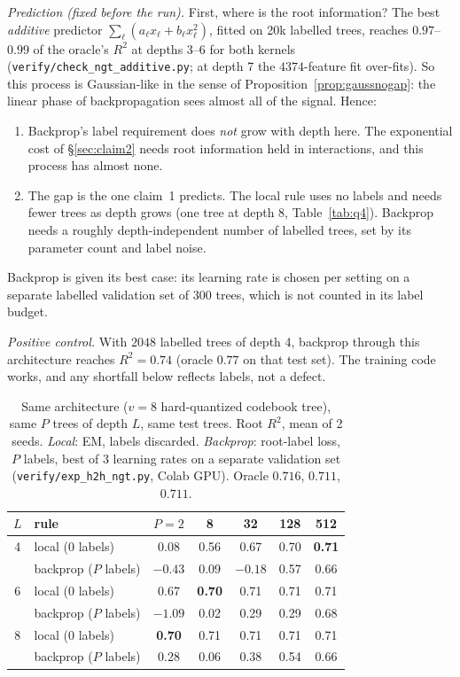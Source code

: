 \documentclass[11pt]{article}
\theoremstyle{definition}
\begin{document}
\emph{Prediction (fixed before the run).} First, where is the root information? The best \emph{additive}
predictor $\sum_\ell(a_\ell x_\ell+b_\ell x_\ell^2)$, fitted on 20k labelled trees, reaches $0.97$--$0.99$ of
the oracle's $R^2$ at depths 3--6 for both kernels (\texttt{verify/check\_ngt\_additive.py}; at depth 7
the $4374$-feature fit over-fits). So this process is Gaussian-like in the sense of
Proposition~\ref{prop:gaussnogap}: the linear phase of backpropagation sees almost all of the signal.
Hence:
\begin{enumerate}
\item[(H1)] Backprop's label requirement does \emph{not} grow with depth here. The exponential cost of
\S\ref{sec:claim2} needs root information held in interactions, and this process has almost none.
\item[(H2)] The gap is the one claim~1 predicts. The local rule uses no labels and needs fewer trees as
depth grows (one tree at depth 8, Table~\ref{tab:q4}). Backprop needs a roughly depth-independent number
of labelled trees, set by its parameter count and label noise.
\end{enumerate}
Backprop is given its best case: its learning rate is chosen per setting on a separate labelled
validation set of 300 trees, which is not counted in its label budget.

\emph{Positive control.} With $2048$ labelled trees of depth 4, backprop through this architecture reaches
$R^2=0.74$ (oracle $0.77$ on that test set). The training code works, and any shortfall below reflects
labels, not a defect.

\begin{table}[h]\centering
\caption{Same architecture ($v=8$ hard-quantized codebook tree), same $P$ trees of depth $L$, same test trees.
Root $R^2$, mean of 2 seeds. \emph{Local}: EM, labels discarded. \emph{Backprop}: root-label loss, $P$
labels, best of 3 learning rates on a separate validation set (\texttt{verify/exp\_h2h\_ngt.py}, Colab
GPU). Oracle $0.716$, $0.711$, $0.711$.}\label{tab:h2hngt}
\small\begin{tabular}{cl|ccccc}\toprule
$L$ & rule & $P=2$ & 8 & 32 & 128 & 512\\\midrule
4 & local (0 labels) & 0.08 & 0.56 & 0.67 & 0.70 & \textbf{0.71}\\
& backprop ($P$ labels) & $-0.43$ & 0.09 & $-0.18$ & 0.57 & 0.66\\\midrule
6 & local (0 labels) & 0.67 & \textbf{0.70} & 0.71 & 0.71 & 0.71\\
& backprop ($P$ labels) & $-1.09$ & 0.02 & 0.29 & 0.29 & 0.68\\\midrule
8 & local (0 labels) & \textbf{0.70} & 0.71 & 0.71 & 0.71 & 0.71\\
& backprop ($P$ labels) & 0.28 & 0.06 & 0.38 & 0.54 & 0.66\\
\bottomrule\end{tabular}
\end{table}
\end{document}
